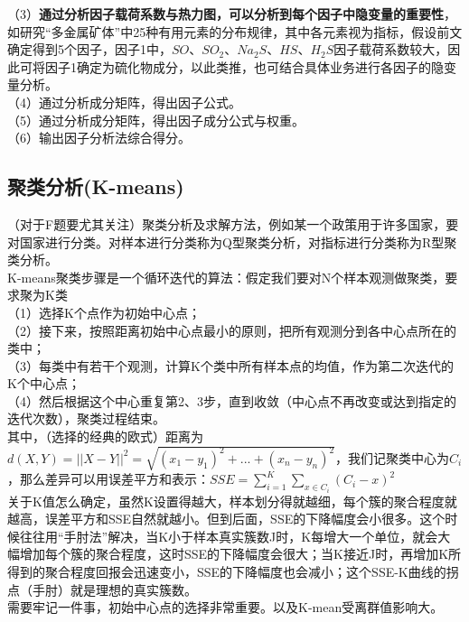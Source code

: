 \documentclass[11pt,a4paper]{article}
\begin{document}
\noindent（3）\textbf{通过分析因子载荷系数与热力图，可以分析到每个因子中隐变量的重要性}，如研究“多金属矿体”中25种有用元素的分布规律，其中各元素视为指标，假设前文确定得到5个因子，因子1中，$SO$、$SO_2$、$Na_2S$、$HS$、$H_2S$因子载荷系数较大，因此可将因子1确定为硫化物成分，以此类推，也可结合具体业务进行各因子的隐变量分析。\\

\noindent（4）通过分析成分矩阵，得出因子公式。\\

\noindent（5）通过分析成分矩阵，得出因子成分公式与权重。\\

\noindent（6）输出因子分析法综合得分。\\





\subsection{聚类分析(K-means)}
（对于F题要尤其关注）聚类分析及求解方法，例如某一个政策用于许多国家，要对国家进行分类。对样本进行分类称为Q型聚类分析，对指标进行分类称为R型聚类分析。\\
\indent\setlength{\parindent}{2em}K-means聚类步骤是一个循环迭代的算法：假定我们要对N个样本观测做聚类，要求聚为K类\\
（1）选择K个点作为初始中心点；\\
（2）接下来，按照距离初始中心点最小的原则，把所有观测分到各中心点所在的类中；\\
（3）每类中有若干个观测，计算K个类中所有样本点的均值，作为第二次迭代的K个中心点；\\
（4）然后根据这个中心重复第2、3步，直到收敛（中心点不再改变或达到指定的迭代次数），聚类过程结束。\\
\indent\setlength{\parindent}{2em}其中，（选择的经典的欧式）距离为$d(X,Y)=||X-Y||^2=\sqrt{(x_1-y_1)^2+...+(x_n-y_n)^2}$，我们记聚类中心为$C_i$，那么差异可以用误差平方和表示：$SSE=\sum\limits_{i=1}^{K} \sum\limits_{x\in C_i}(C_i-x)^2$\\
\indent\setlength{\parindent}{2em}关于K值怎么确定，虽然K设置得越大，样本划分得就越细，每个簇的聚合程度就越高，误差平方和SSE自然就越小。但到后面，SSE的下降幅度会小很多。这个时候往往用“手肘法”解决，当K小于样本真实簇数J时，K每增大一个单位，就会大幅增加每个簇的聚合程度，这时SSE的下降幅度会很大；当K接近J时，再增加K所得到的聚合程度回报会迅速变小，SSE的下降幅度也会减小；这个SSE-K曲线的拐点（手肘）就是理想的真实簇数。\\
\indent\setlength{\parindent}{2em}需要牢记一件事，初始中心点的选择非常重要。以及K-mean受离群值影响大。\\
\newpage
\end{document}
